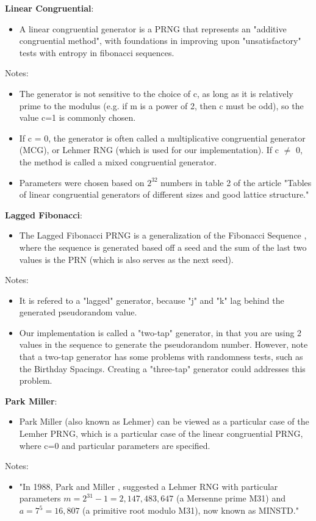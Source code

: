 \documentclass[conference]{IEEEtran}
\begin{document}
\noindent\textbf{Linear Congruential}:
\begin{itemize}
    \item A linear congruential generator is a PRNG that represents an "additive congruential method", with foundations in improving upon "unsatisfactory" tests with entropy in fibonacci sequences. \cite{10.1145/321008.321019}
\end{itemize}
Notes:
\begin{itemize}
    \item The generator is not sensitive to the choice of c, 
as long as it is relatively prime to the modulus 
(e.g. if m is a power of 2, then c must be odd), 
so the value c=1 is commonly chosen.
    \item If c = 0, the generator is often called a multiplicative
congruential generator (MCG), or Lehmer RNG (which is used for our implementation). If c $\neq$ 0, the
method is called a mixed congruential generator.
    \item Parameters were chosen based on $2^32$ numbers in table 2 of the article "Tables of linear congruential generators of different sizes and good lattice structure." \cite{LEcuyer1999TablesOL}
\end{itemize}


\noindent\textbf{Lagged Fibonacci}:
\begin{itemize}
    \item The Lagged Fibonacci PRNG is a generalization of the Fibonacci Sequence \cite{lucas1891calcul}, where the sequence is generated based off a seed and the sum of the last two values is the PRN (which is also serves as the next seed).
\end{itemize}
Notes:
\begin{itemize}
    \item It is refered to a "lagged" generator, because "j" and "k" lag behind the generated pseudorandom value. 
    \item Our implementation is called a "two-tap" generator, in that you are using 2 values in the sequence 
to generate the pseudorandom number. However, note that a two-tap generator has some problems with 
randomness tests, such as the Birthday Spacings. Creating a "three-tap" generator could
addresses this problem.
\end{itemize}


\noindent\textbf{Park Miller}:
\begin{itemize}
    \item Park Miller (also known as Lehmer) can be viewed as a particular case of the Lemher PRNG, which is a particular case of the linear congruential PRNG, where c=0 and particular parameters are specified.
\end{itemize}
Notes:
\begin{itemize}
    \item "In 1988, Park and Miller \cite{10.1145/63039.63042}, suggested a Lehmer RNG with particular parameters $m = 2^{31}-1 = 2,147,483,647$ (a Mersenne prime M31) and $a = 7^{5} = 16,807$ (a primitive root modulo M31), now known as MINSTD." \cite{ParkMiller}
\end{itemize}
\end{document}

